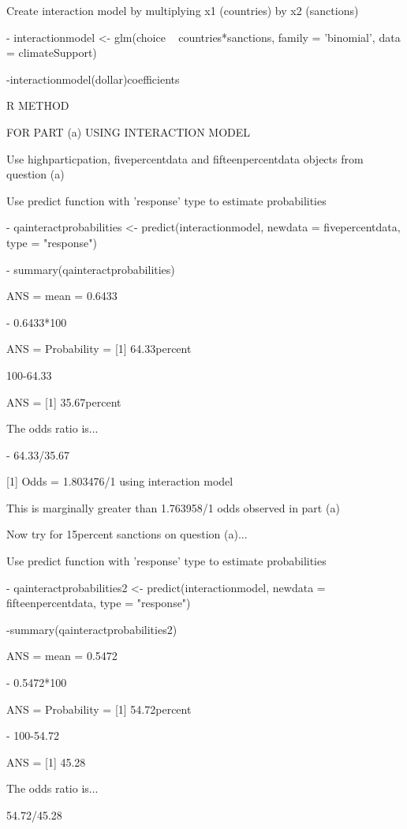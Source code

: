 \documentclass[12pt,letterpaper]{article}
\begin{document}
\begin{enumerate}
\begin{enumerate}
\vspace{1cm}

Create interaction model by multiplying x1 (countries) by x2 (sanctions)

	- interactionmodel <- glm(choice ~ countries*sanctions, family = 'binomial', data = climateSupport)
	
	-interactionmodel(dollar)coefficients


R METHOD
\vspace{1cm}

FOR PART (a)  USING INTERACTION MODEL

Use highparticpation, fivepercentdata and fifteenpercentdata objects from question (a)

Use predict function with 'response' type to estimate probabilities

	- qainteractprobabilities <- predict(interactionmodel, newdata = fivepercentdata, type = "response")
	
	- summary(qainteractprobabilities) 
	
ANS = mean = 0.6433

	- 0.6433*100 

ANS = Probability = [1] 64.33percent

100-64.33 

ANS = [1] 35.67percent

The odds ratio is...
	
	- 64.33/35.67 

[1] Odds = 1.803476/1 using interaction model


This is marginally greater than 1.763958/1 odds observed in part (a)
\vspace{1cm}

 Now try for 15percent sanctions on question (a)...
 
Use predict function with 'response' type to estimate probabilities

	- qainteractprobabilities2 <- predict(interactionmodel, newdata = fifteenpercentdata, type = "response")

	-summary(qainteractprobabilities2) 

ANS = mean = 0.5472

	- 0.5472*100 

ANS = Probability = [1] 54.72percent

	- 100-54.72 
	
ANS = [1] 45.28

The odds ratio is...

54.72/45.28 


\end{enumerate}
\end{enumerate}
\end{document}
